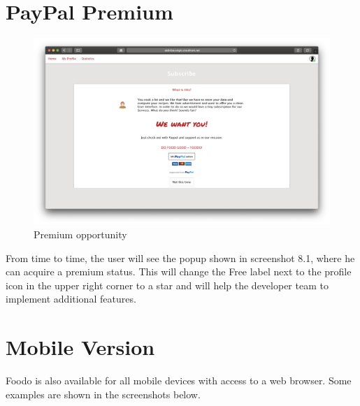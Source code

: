 \section*{PayPal Premium}
\vspace{-2em}
\begin{figure}[H]
	\captionsetup{justification=centering}
	\begin{center}
		\includegraphics[scale=0.25]{Ressourcen/img/screenshots/screenshotR.png}
		\vspace{-3em}
		\caption{Premium opportunity}
	\end{center}
\end{figure}
From time to time, the user will see the popup shown in screenshot 8.1, where he can acquire a premium status. This will change the Free label next to the profile icon in the upper right corner to a star and will help the developer team to implement additional features.

\section*{Mobile Version}
Foodo is also available for all mobile devices with access to a web browser. Some examples are shown in the screenshots below.

